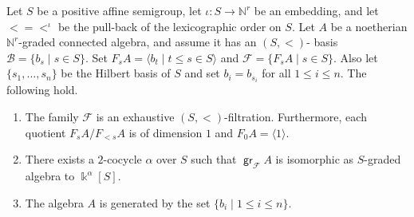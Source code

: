 \documentclass[11pt,fleqn]{article}
\newcommand\NN{\mathbb N}
\renewcommand\to{\longrightarrow}
\newcommand\B{\mathcal B}
\newcommand\F{\mathcal F}
\renewcommand\k{\Bbbk}
\DeclareMathOperator\gr{\mathsf{gr}}
\begin{document}
\begin{Lemma*}
Let $S$ be a positive affine semigroup, let $\iota: S \to \NN^r$ be an embedding, and 
let $< = <^\iota$ be the pull-back of the lexicographic order on $S$.
Let $A$ be a noetherian $\NN^r$-graded connected algebra, and assume it has an $(S,<)$-
basis $\B = \{b_s \mid s \in S\}$. Set $F_sA = \langle b_t \mid t \leq s \in S \rangle$
and $\F = \{F_sA \mid s \in S\}$. Also let $\{s_1, \ldots, s_n\}$ be the Hilbert basis of $S$
and set $b_i = b_{s_i}$ for all $1 \leq i \leq n$. The following hold.
\begin{enumerate}
\item The family $\F$ is an exhaustive $(S,<)$-filtration. Furthermore,
each quotient $F_sA / F_{<s}A$ is of dimension $1$ and $F_0A = \langle 1 \rangle$.

\item There exists a $2$-cocycle $\alpha$ over $S$ such that $\gr_\F A$ is isomorphic as 
$S$-graded algebra to $\k^\alpha[S]$.

\item The algebra $A$ is generated by the set $\{b_i \mid 1 \leq i \leq n\}$.
\end{enumerate} 
\end{Lemma*}
\end{document}
